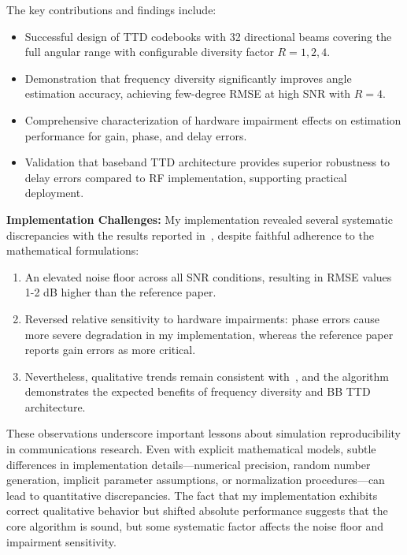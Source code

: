 \documentclass[12pt,letterpaper]{article}
\begin{document}
The key contributions and findings include:
\begin{itemize}
    \item Successful design of TTD codebooks with 32 directional beams covering the full angular range with configurable diversity factor $R = 1, 2, 4$.
    \item Demonstration that frequency diversity significantly improves angle estimation accuracy, achieving few-degree RMSE at high SNR with $R = 4$.
    \item Comprehensive characterization of hardware impairment effects on estimation performance for gain, phase, and delay errors.
    \item Validation that baseband TTD architecture provides superior robustness to delay errors compared to RF implementation, supporting practical deployment.
\end{itemize}

\textbf{Implementation Challenges:} My implementation revealed several systematic discrepancies with the results reported in~\cite{boljanovic2020design}, despite faithful adherence to the mathematical formulations:

\begin{enumerate}
    \item An elevated noise floor across all SNR conditions, resulting in RMSE values 1-2 dB higher than the reference paper.
    \item Reversed relative sensitivity to hardware impairments: phase errors cause more severe degradation in my implementation, whereas the reference paper reports gain errors as more critical.
    \item Nevertheless, qualitative trends remain consistent with~\cite{boljanovic2020design}, and the algorithm demonstrates the expected benefits of frequency diversity and BB TTD architecture.
\end{enumerate}

These observations underscore important lessons about simulation reproducibility in communications research. Even with explicit mathematical models, subtle differences in implementation details—numerical precision, random number generation, implicit parameter assumptions, or normalization procedures—can lead to quantitative discrepancies. The fact that my implementation exhibits correct qualitative behavior but shifted absolute performance suggests that the core algorithm is sound, but some systematic factor affects the noise floor and impairment sensitivity.
\end{document}
